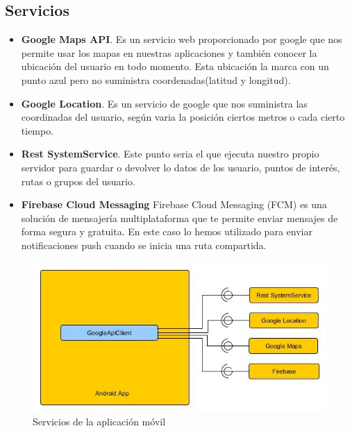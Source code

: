 \subsection{Servicios}
\begin{itemize}
\item \textbf{Google Maps API}. Es un servicio web proporcionado por google que nos permite usar los mapas en nuestras aplicaciones y también conocer la ubicación del usuario  en todo momento. Esta ubicación la marca con un punto azul pero no suministra coordenadas(latitud y longitud).
\item \textbf{Google Location}. Es un servicio de google que nos suministra las coordinadas del usuario, según varia la posición ciertos metros o cada cierto tiempo.
\item \textbf{Rest SystemService}. Este punto seria el que ejecuta nuestro propio servidor para guardar o devolver lo datos de los usuario, puntos de interés, rutas o grupos del usuario.
\item \textbf{Firebase Cloud Messaging} Firebase Cloud Messaging (FCM) es una solución de mensajería multiplataforma que te permite enviar mensajes de forma segura y gratuita. En este caso lo hemos utilizado para enviar notificaciones push cuando se inicia una ruta compartida.
\end{itemize}
\begin{figure}[H]
		\centering
		\includegraphics[width=\textwidth] {arquitectura-movil.jpg}
		\caption{Servicios de la aplicación móvil }
		\label{fig:arquitectura-movil}
	\end{figure}
	
	
